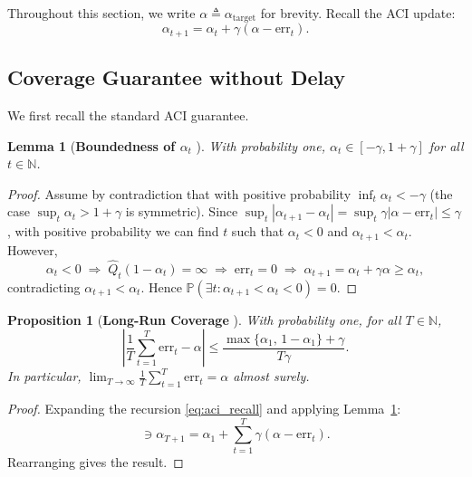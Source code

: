 \documentclass[letterpaper, 10 pt, conference]{ieeeconf}  %
\newtheorem{mylem}{\bf Lemma}
\newtheorem{myprop}{\bf Proposition}
\begin{document}
Throughout this section, we write $\alpha \triangleq \alpha_{\text{target}}$ for brevity. Recall the ACI update:
\begin{equation}
    \alpha_{t+1} = \alpha_t + \gamma(\alpha - \text{err}_t).
    \label{eq:aci_recall}
\end{equation}

\subsection{Coverage Guarantee without Delay}

We first recall the standard ACI guarantee.

\begin{mylem}[\textbf{Boundedness of $\alpha_t$} {\cite[Lemma~4.1]{gibbs2021adaptive}}]
\label{lem:bound_nodelay}
With probability one, $\alpha_t \in [-\gamma, 1+\gamma]$ for all $t \in \mathbb{N}$.
\end{mylem}

\begin{proof}
Assume by contradiction that with positive probability $\inf_t \alpha_t < -\gamma$ (the case $\sup_t \alpha_t > 1+\gamma$ is symmetric). Since $\sup_t |\alpha_{t+1} - \alpha_t| = \sup_t \gamma|\alpha - \text{err}_t| \le \gamma$, with positive probability we can find $t$ such that $\alpha_t < 0$ and $\alpha_{t+1} < \alpha_t$. However,
\begin{equation}
    \alpha_t < 0 \;\Longrightarrow\; \hat{Q}_t(1-\alpha_t) = \infty \;\Longrightarrow\; \text{err}_t = 0 \;\Longrightarrow\; \alpha_{t+1} = \alpha_t + \gamma\alpha \ge \alpha_t,
\end{equation}
contradicting $\alpha_{t+1} < \alpha_t$. Hence $\mathbb{P}(\exists t: \alpha_{t+1} < \alpha_t < 0) = 0$.
\end{proof}

\begin{myprop}[\textbf{Long-Run Coverage} {\cite[Prop.~4.1]{gibbs2021adaptive}}]
\label{prop:coverage_nodelay}
With probability one, for all $T \in \mathbb{N}$,
\begin{equation}
    \left| \frac{1}{T} \sum_{t=1}^T \text{err}_t - \alpha \right| \le \frac{\max\{\alpha_1,\, 1-\alpha_1\} + \gamma}{T\gamma}.
    \label{eq:coverage_nodelay}
\end{equation}
In particular, $\lim_{T \to \infty} \frac{1}{T}\sum_{t=1}^T \text{err}_t = \alpha$ almost surely.
\end{myprop}

\begin{proof}
Expanding the recursion \eqref{eq:aci_recall} and applying Lemma~\ref{lem:bound_nodelay}:
\begin{equation}
    [-\gamma, 1+\gamma] \ni \alpha_{T+1} = \alpha_1 + \sum_{t=1}^T \gamma(\alpha - \text{err}_t).
\end{equation}
Rearranging gives the result.
\end{proof}
\end{document}
